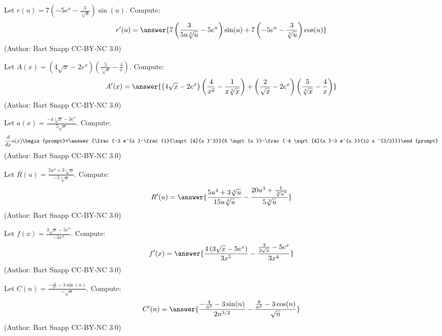 \documentclass{ximera}
\begin{document}
  \begin{problem}\label{prob:240hom4prob7}
Let $r(u) = 7 \left(-5 e^u-\frac{3}{\sqrt[5]{u}}\right) \sin (u)$. Compute:
\[
r'(u)
=\answer{7 \left(\frac{3}{5 u \sqrt[5]{u}}-5 e^u\right) \sin (u)+7 \left(-5 e^u-\frac{3}{\sqrt[5]{u}}\right) \cos (u)}
\]
(Author: Bart Snapp CC-BY-NC 3.0)
 \end{problem}
 
 \begin{problem}\label{prob:240hom4prob8}
Let $A(x) = \left(4 \sqrt{x }-2 e^{x }\right) \left(\frac{5}{\sqrt[5]{x }}-\frac{4}{x }\right)$. Compute:
\[
A'(x)
=\answer{\left(4 \sqrt{x }-2 e^{x }\right) \left(\frac{4}{x ^2}-\frac{1}{x  \sqrt[5]{x }}\right)+\left(\frac{2}{\sqrt{x }}-2 e^{x }\right) \left(\frac{5}{\sqrt[5]{x }}-\frac{4}{x }\right)}
\]
(Author: Bart Snapp CC-BY-NC 3.0)
 \end{problem}
 
 \begin{problem}\label{prob:240hom4prob9}
Let $a(x) = \frac{ -4 \sqrt[4]{x }-3 e^{x }}{5 \sqrt{x }}$. Compute:
\[
\frac{d}{dx}a(x)
\begin{prompt}=\answer{\frac{-3 e^{x }-\frac{1}{\sqrt[4]{x }^3}}{5 \sqrt{x }}-\frac{-4 \sqrt[4]{x }-3 e^{x }}{10 x ^{3/2}}}\end{prompt}
\]
(Author: Bart Snapp CC-BY-NC 3.0)
 \end{problem}
 
  \begin{problem}\label{prob:240hom4prob10}
Let $R(u) = \frac{ 5 u^4+3 \sqrt[3]{u}}{-5 \sqrt[3]{u}}$. Compute:
\[
R'(u)
=\answer{\frac{5 u^4+3 \sqrt[3]{u}}{15 u \sqrt[3]{u}}-\frac{20 u^3+\frac{1}{\sqrt[3]{u}^2}}{5 \sqrt[3]{u}}}
\]
(Author: Bart Snapp CC-BY-NC 3.0)
 \end{problem}
 
 \begin{problem}\label{prob:240hom4prob11}
Let $f(x) = \frac{ 3 \sqrt{x }-5 e^{x }}{-3 x ^4}$. Compute:
\[
f'(x)
=\answer{\frac{4 \left(3 \sqrt{x }-5 e^{x }\right)}{3 x ^5}-\frac{\frac{3}{2 \sqrt{x }}-5 e^{x }}{3 x ^4}}
\]
(Author: Bart Snapp CC-BY-NC 3.0)
 \end{problem}
 
 \begin{problem}\label{prob:240hom4prob12}
Let $C(n) = \frac{ -\frac{4}{n^2}-3 \sin (n)}{-\sqrt{n}}$. Compute:
\[
C'(n)
=\answer{\frac{-\frac{4}{n^2}-3 \sin (n)}{2 n^{3/2}}-\frac{\frac{8}{n^3}-3 \cos (n)}{\sqrt{n}}}
\]
(Author: Bart Snapp CC-BY-NC 3.0)
 \end{problem}
 
\end{document}
